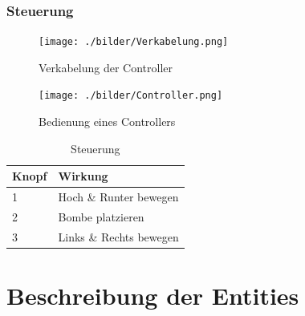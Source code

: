 \documentclass[parskip=full]{scrartcl}
\begin{document}
		
		\section{Steuerung}
			\begin{figure}[H]
				\centering
				\texttt{[image: ./bilder/Verkabelung.png]}
				\caption{Verkabelung der Controller}
			\end{figure}
			\begin{figure}[H]
				\centering
				\texttt{[image: ./bilder/Controller.png]}
				\caption{Bedienung eines Controllers}
			\end{figure}
			\begin{table}[H]
				\centering
				\label{controls}
				\begin{tabular}{|l|l|}
					\hline
					\textbf{Knopf} & \textbf{Wirkung}      \\ \hline
					1           & Hoch \& Runter bewegen               \\ \hline
					2           & Bombe platzieren                 \\ \hline
					3           & Links \& Rechts bewegen                    \\ \hline
				\end{tabular}
				\caption{Steuerung}
			\end{table}
			
	
	\part{Beschreibung der Entities}
\end{document}

